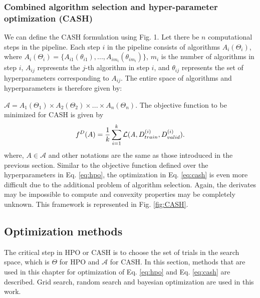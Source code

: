 \subsubsection{Combined algorithm selection and hyper-parameter optimization (CASH)}
\label{subsubsec_CASH}
We can define the CASH formulation using Fig. 1. Let there be $n$ computational steps in the pipeline. Each step $i$ in the pipeline consists of algorithms $A_i(\Theta_i)$, where $A_i(\Theta_i) = \{A_{i1}(\theta_{i1}), ..., A_{im_{i}}(\theta_{im_{i}})\}$, $m_{i}$ is the number of algorithms in step $i$, $A_{ij}$ represents the $j$-th algorithm in step $i$, and \textbf{$\theta_{ij}$} represents the set of hyperparameters corresponding to  $A_{ij}$. The entire space of algorithms and hyperparameters is therefore given by: \par
\noindent $\mathcal{A} = A_1(\Theta_1) \times A_2(\Theta_2) \times ... \times A_n(\Theta_n)$. The objective function to be minimized for CASH is given by
\begin{equation}
f^D(A) = \frac{1}{k}\sum_{i=1}^{k} \mathcal{L}(\emph{A}, D_{train}^{(i)}, D_{valid}^{(i)}).
\label{eq:cash}
\end{equation}
where, $A \in \mathcal{A}$ and other notations are the same as those introduced in the previous section.
Similar to the objective function defined over the hyperparameters in Eq. \ref{eq:hpo}, the optimization in Eq. \ref{eq:cash} is even more difficult due to the additional problem of algorithm selection. Again, the derivates may be impossible to compute and convexity properties may be completely unknown. This framework is represented in Fig. \ref{fig:CASH}.



\subsection{Optimization methods}
\label{optimization}
The critical step in HPO or CASH is to choose the set of trials in the search space, which is $\Theta$ for HPO and $\mathcal{A}$ for CASH. In this section, methods that are used in this chapter for optimization of Eq. \ref{eq:hpo} and Eq. \ref{eq:cash} are described. Grid search, random search and bayesian optimization are used in this work.
